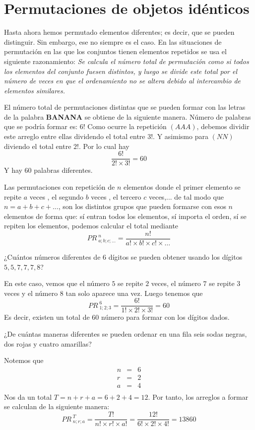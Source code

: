 \documentclass[12pt]{article}
\begin{document}
\section{Permutaciones de objetos idénticos}
Hasta ahora hemos permutado elementos diferentes; es decir, que se pueden distinguir. Sin embargo, ese no siempre es el caso. 
En las situaciones de permutación en las que los conjuntos tienen elementos repetidos se usa el siguiente razonamiento:  \textit{Se calcula el número total de permutación como si todos los elementos del conjunto fuesen distintos, y luego se divide este total por el número de veces en que el ordenamiento no se altera debido al intercambio de elementos similares.} 

\begin{ejemplo}
El número total de permutaciones distintas que se pueden formar con las letras de la palabra \textbf{BANANA} se obtiene de la siguiente manera.  Número de palabras que se podría formar es: $6!$ 
Como ocurre la repetición $(AAA)$, debemos dividir este arreglo entre ellas dividendo el total entre 3!. Y asimismo para $(NN)$ diviendo el total entre $2!$. Por lo cual hay
\[\frac{6!}{2!\times 3!}=60\]
Y hay $60$ palabras diferentes.
\end{ejemplo}

\begin{definicion} Las permutaciones con repetición de $n$ elementos donde el primer elemento se repite $a$ veces , el segundo $b$ veces , el tercero $c$ veces,... de tal modo que $n=a+b+c+...$, son los distintos grupos que pueden formarse con esos $n$ elementos de forma que: sí entran todos los elementos, sí importa el orden, sí se repiten los elementos, podemos calcular el total mediante
\[PR^{\;n}_{\;a;b;c;\ldots}=\frac{n!}{a!\times b!\times c!\times \ldots}\]
\end{definicion}
\begin{ejemplo}
¿Cuántos números diferentes de 6 dígitos se pueden obtener usando los dígitos $5,5,7,7,7,8$?
\end{ejemplo}
\begin{solucion}
 En este caso, vemos que el número $5$ se repite $2$ veces, el número $7$ se repite $3$ veces y el número $8$ tan solo aparece una vez. Luego tenemos que
 \[PR^{\;6}_{\;1;2;3}=\frac{6!}{1!\times 2!\times 3!}=60\]
 Es decir, existen un total de $60$ número para formar con los dígitos dados.
\end{solucion}
\begin{ejemplo}
¿De cuántas maneras diferentes se pueden ordenar en una fila seis sodas negras, dos rojas y cuatro amarillas?
\end{ejemplo}
\begin{solucion}
Notemos que
\begin{eqnarray*}
    n&=&6\\
    r&=&2\\
    a&=&4\\
\end{eqnarray*}
Nos da un total $T=n+r+a=6+2+4=12$. Por tanto, los arreglos a formar se calculan de la siguiente manera:
\[PR^{\;T}_{\;n;r;a}=\frac{T!}{n!\times r!\times a!}=\frac{12!}{6!\times 2!\times 4!}=13860\]
\end{solucion}
\end{document}
